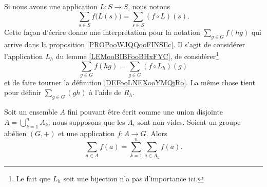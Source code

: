 Si nous avons une application \( L\colon S\to S\), nous notons
\begin{equation}
    \sum_{s\in S}f\big( L(s) \big)=\sum_{s\in S}(f\circ L)(s).
\end{equation}
Cette façon d'écrire donne une interprétation pour la notation \( \sum_{g\in G}f(hg)\) qui arrive dans la proposition \ref{PROPooWJQQooFINSEc}. Il s'agit de considérer l'application \( L_h\) du lemme \ref{LEMooBIBFooBHxFYC}, de considérer\footnote{Le fait que \( L_h\) soit une bijection n'a pas d'importance ici.}
\begin{equation}        \label{EQooQQBEooFDOBVG}
    \sum_{g\in G}f(hg)=\sum_{g\in G}(f\circ L_h)(g)
\end{equation}
et de faire tourner la définition \ref{DEFooLNEXooYMQjRo}. La même chose tient pour définir \( \sum_{g\in G}(gh)\) à l'aide de \( R_h\).


\begin{lemma}
    Soit un ensemble \( A\) fini pouvant être écrit comme une union disjointe \( A=\bigcup_{k=1}^nA_k\); nous supposons que les \( A_i\) sont non vides. Soient un groupe abélien \( (G,+)\) et une application \( f\colon A\to G\). Alors
    \begin{equation}
        \sum_{a\in A}f(a)=\sum_{k=1}^n\sum_{a\in A_k}f(a).
    \end{equation}
\end{lemma}


